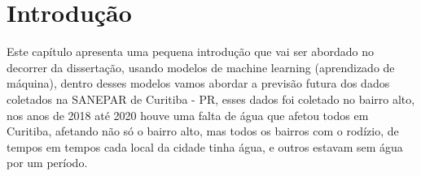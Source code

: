 

\section{Introdução} \label{sec:int}

Este capítulo apresenta uma pequena introdução que vai ser abordado no decorrer da dissertação, usando modelos de machine learning (aprendizado de máquina), dentro desses modelos vamos abordar a previsão futura dos dados coletados na SANEPAR de Curitiba - PR, esses dados foi coletado no bairro alto, nos anos de 2018 até 2020 houve uma falta de água que afetou todos em Curitiba, afetando não só o bairro alto, mas todos os bairros com o rodízio, de tempos em tempos cada local da cidade tinha água, e outros estavam sem água por um período.





    
    
    
        
    
    
    
    
    
    
    
    